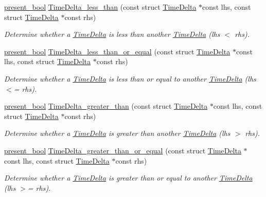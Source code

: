 \begin{DoxyCompactItemize}
\hyperlink{types_8h_a1c24e2cdd988b886e889080ded176ae0}{present\-\_\-bool} \hyperlink{time-delta_8h_a17c72c9312884c0aabbfbcc6c195fa5e}{\-Time\-Delta\-\_\-less\-\_\-than} (const struct \hyperlink{structTimeDelta}{\-Time\-Delta} $\ast$const lhs, const struct \hyperlink{structTimeDelta}{\-Time\-Delta} $\ast$const rhs)
\begin{DoxyCompactList}\small\item\em \-Determine whether a \hyperlink{structTimeDelta}{\-Time\-Delta} is less than another \hyperlink{structTimeDelta}{\-Time\-Delta} (lhs $<$ rhs). \end{DoxyCompactList}\item 
\hyperlink{types_8h_a1c24e2cdd988b886e889080ded176ae0}{present\-\_\-bool} \hyperlink{time-delta_8h_a719a2e8e64a3f680cff26b4d871a61d3}{\-Time\-Delta\-\_\-less\-\_\-than\-\_\-or\-\_\-equal} (const struct \hyperlink{structTimeDelta}{\-Time\-Delta} $\ast$const lhs, const struct \hyperlink{structTimeDelta}{\-Time\-Delta} $\ast$const rhs)
\begin{DoxyCompactList}\small\item\em \-Determine whether a \hyperlink{structTimeDelta}{\-Time\-Delta} is less than or equal to another \hyperlink{structTimeDelta}{\-Time\-Delta} (lhs $<$= rhs). \end{DoxyCompactList}\item 
\hyperlink{types_8h_a1c24e2cdd988b886e889080ded176ae0}{present\-\_\-bool} \hyperlink{time-delta_8h_aaf70b7980933d5b2eb4261197da08d20}{\-Time\-Delta\-\_\-greater\-\_\-than} (const struct \hyperlink{structTimeDelta}{\-Time\-Delta} $\ast$const lhs, const struct \hyperlink{structTimeDelta}{\-Time\-Delta} $\ast$const rhs)
\begin{DoxyCompactList}\small\item\em \-Determine whether a \hyperlink{structTimeDelta}{\-Time\-Delta} is greater than another \hyperlink{structTimeDelta}{\-Time\-Delta} (lhs $>$ rhs). \end{DoxyCompactList}\item 
\hyperlink{types_8h_a1c24e2cdd988b886e889080ded176ae0}{present\-\_\-bool} \hyperlink{time-delta_8h_afc8207e3bd84d8037f99ad99a0c76b04}{\-Time\-Delta\-\_\-greater\-\_\-than\-\_\-or\-\_\-equal} (const struct \hyperlink{structTimeDelta}{\-Time\-Delta} $\ast$const lhs, const struct \hyperlink{structTimeDelta}{\-Time\-Delta} $\ast$const rhs)
\begin{DoxyCompactList}\small\item\em \-Determine whether a \hyperlink{structTimeDelta}{\-Time\-Delta} is greater than or equal to another \hyperlink{structTimeDelta}{\-Time\-Delta} (lhs $>$= rhs). \end{DoxyCompactList}\end{DoxyCompactItemize}



